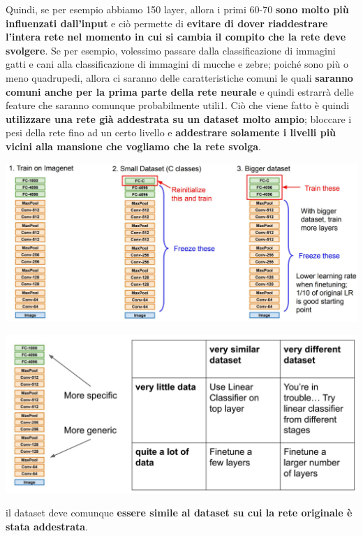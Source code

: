 \documentclass[12pt]{article}
\begin{document}
Quindi, se per esempio abbiamo 150 layer, allora i primi 60-70 \textbf{sono molto più influenzati dall'input} e ciò permette di \textbf{evitare di dover riaddestrare l'intera rete nel momento in cui si cambia il compito che la rete deve svolgere}.
Se per esempio, volessimo passare dalla classificazione di immagini gatti e cani alla classificazione di immagini di mucche e zebre; poiché sono più o meno quadrupedi, allora ci saranno delle caratteristiche comuni le quali \textbf{saranno comuni anche per la prima parte della rete neurale} e quindi estrarrà delle feature che saranno comunque probabilmente utili1.
Ciò che viene fatto è quindi \textbf{utilizzare una rete già addestrata su un dataset molto ampio}; bloccare i pesi della rete fino ad un certo livello e \textbf{addestrare solamente i livelli più vicini alla mansione che vogliamo che la rete svolga}.
\begin{center}
    \includegraphics[width =1\linewidth]{Images/162.PNG}
\end{center}
\begin{center}
    \includegraphics[width =1\linewidth]{Images/163.PNG}
\end{center}
il dataset deve comunque \textbf{essere simile al dataset su cui la rete originale è stata addestrata}.
\end{document}
